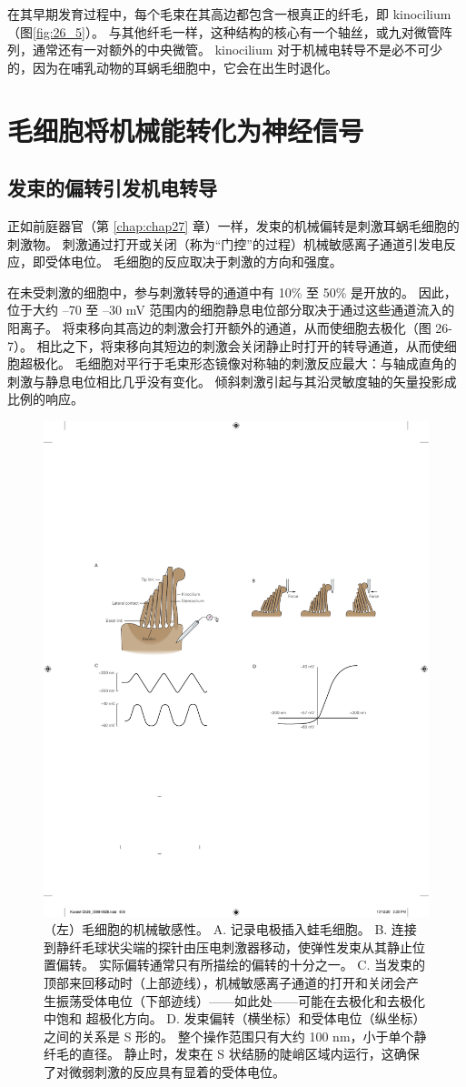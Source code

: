 在其早期发育过程中，每个毛束在其高边都包含一根真正的纤毛，即 kinocilium（图\ref{fig:26_5}）。 
与其他纤毛一样，这种结构的核心有一个轴丝，或九对微管阵列，通常还有一对额外的中央微管。 
kinocilium 对于机械电转导不是必不可少的，因为在哺乳动物的耳蜗毛细胞中，它会在出生时退化。


\section{毛细胞将机械能转化为神经信号}


\subsection{发束的偏转引发机电转导}
正如前庭器官（第 \ref{chap:chap27} 章）一样，发束的机械偏转是刺激耳蜗毛细胞的刺激物。 
刺激通过打开或关闭（称为“门控”的过程）机械敏感离子通道引发电反应，即受体电位。 
毛细胞的反应取决于刺激的方向和强度。


在未受刺激的细胞中，参与刺激转导的通道中有 10\% 至 50\% 是开放的。 
因此，位于大约 –70 至 –30 mV 范围内的细胞静息电位部分取决于通过这些通道流入的阳离子。 
将束移向其高边的刺激会打开额外的通道，从而使细胞去极化（图 26-7）。 
相比之下，将束移向其短边的刺激会关闭静止时打开的转导通道，从而使细胞超极化。 
毛细胞对平行于毛束形态镜像对称轴的刺激反应最大：与轴成直角的刺激与静息电位相比几乎没有变化。 
倾斜刺激引起与其沿灵敏度轴的矢量投影成比例的响应。

\begin{figure}[htbp]
	\centering
	\includegraphics[width=0.5\linewidth]{chap26/fig_26_7}
	\caption{（左）毛细胞的机械敏感性。 
		A. 记录电极插入蛙毛细胞。 
		B. 连接到静纤毛球状尖端的探针由压电刺激器移动，使弹性发束从其静止位置偏转。 
		实际偏转通常只有所描绘的偏转的十分之一。 
		C. 当发束的顶部来回移动时（上部迹线），机械敏感离子通道的打开和关闭会产生振荡受体电位（下部迹线）——如此处——可能在去极化和去极化中饱和 超极化方向。 
		D. 发束偏转（横坐标）和受体电位（纵坐标）之间的关系是 S 形的。 
		整个操作范围只有大约 100 nm，小于单个静纤毛的直径。 
		静止时，发束在 S 状结肠的陡峭区域内运行，这确保了对微弱刺激的反应具有显着的受体电位。}
	\label{fig:26_7}
\end{figure}


